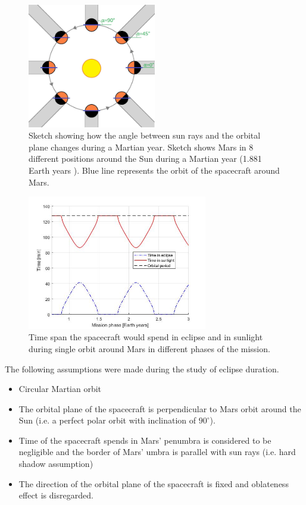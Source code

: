 \documentclass[a4paper, oneside, 11pt]{article}
\begin{document}
\begin{figure}[H]
	\centering 
	\includegraphics[width=0.5\textwidth]
    {Pictures/mars_seasons.jpg}
    \caption{Sketch showing how the angle between sun rays and the orbital plane changes during a Martian year. Sketch shows Mars in 8 different positions around the Sun during a Martian year (1.881 Earth years \cite{Mars Fact Sheet}). Blue line represents the orbit of the spacecraft around Mars.}
    \label{picture_mars_seasons}
\end{figure}

\begin{figure}[H]
	\centering 
	\includegraphics[width=0.7\textwidth]
    {Pictures/eclipse_duration.jpg}
    \caption{Time span the spacecraft would spend in eclipse and in sunlight during single orbit around Mars in different phases of the mission.}
    \label{picture_eclipse_duration}
\end{figure}

The following assumptions were made during the study of eclipse duration.
\begin{itemize}
\item Circular Martian orbit
\item The orbital plane of the spacecraft is perpendicular to Mars orbit around the Sun (i.e. a perfect polar orbit with inclination of $90^{\circ}$).
\item Time of the spacecraft spends in Mars' penumbra is considered to be negligible and the border of Mars' umbra is parallel with sun rays (i.e. hard shadow assumption)
\item The direction of the orbital plane of the spacecraft is fixed and oblateness effect is disregarded. 
\end{itemize}
\end{document}
